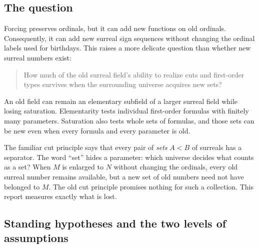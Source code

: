 \documentclass[11pt,letterpaper]{article}
\numberwithin{equation}{section}
\theoremstyle{definition}
\theoremstyle{remark}
\begin{document}
\subsection{The question}

Forcing preserves ordinals, but it can add new functions on old ordinals.
Consequently, it can add new surreal sign sequences without changing the
ordinal labels used for birthdays. This raises a more delicate question than
whether new surreal numbers exist:
\begin{quote}
How much of the old surreal field's ability to realize cuts and first-order
types survives when the surrounding universe acquires new sets?
\end{quote}
An old field can remain an elementary subfield of a larger surreal field while
losing saturation. Elementarity tests individual first-order formulas with
finitely many parameters. Saturation also tests whole sets of formulas, and
those sets can be new even when every formula and every parameter is old.

The familiar cut principle says that every pair of \emph{sets} $A<B$ of
surreals has a separator. The word ``set'' hides a parameter: which universe
decides what counts as a set? When $M$ is enlarged to $N$ without changing the
ordinals, every old surreal number remains available, but a new set of old
numbers need not have belonged to $M$. The old cut principle promises nothing
for such a collection. This report measures exactly what is lost.

\subsection{Standing hypotheses and the two levels of assumptions}\label{univ:sub:levels}
\end{document}
